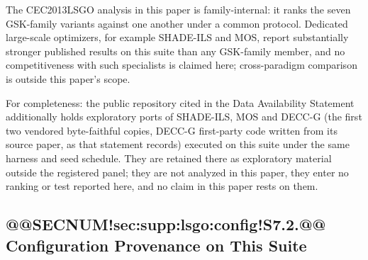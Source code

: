 \documentclass[10pt,a4paper]{article}
\begin{document}
The CEC2013LSGO analysis in this paper is family-internal: it ranks the
seven GSK-family variants against one another under a common protocol.
Dedicated large-scale optimizers, for example
SHADE-ILS and MOS,
report substantially stronger published results on this suite than any
GSK-family member, and no competitiveness with such specialists is claimed
here; cross-paradigm comparison is outside this paper's scope.

For completeness: the public repository cited in the Data Availability
Statement additionally holds exploratory ports of SHADE-ILS, MOS
and DECC-G (the first two vendored byte-faithful copies, DECC-G first-party
code written from its source paper, as that statement records) executed on
this suite under the same harness and seed schedule.
They are retained there as exploratory material outside the registered
panel; they are not analyzed in this paper, they enter no ranking or test
reported here, and no claim in this paper rests on them.

\subsection{@@SECNUM!sec:supp:lsgo:config!S7.2.@@ Configuration Provenance on This Suite}\label{sec:supp:lsgo:config}
\end{document}
